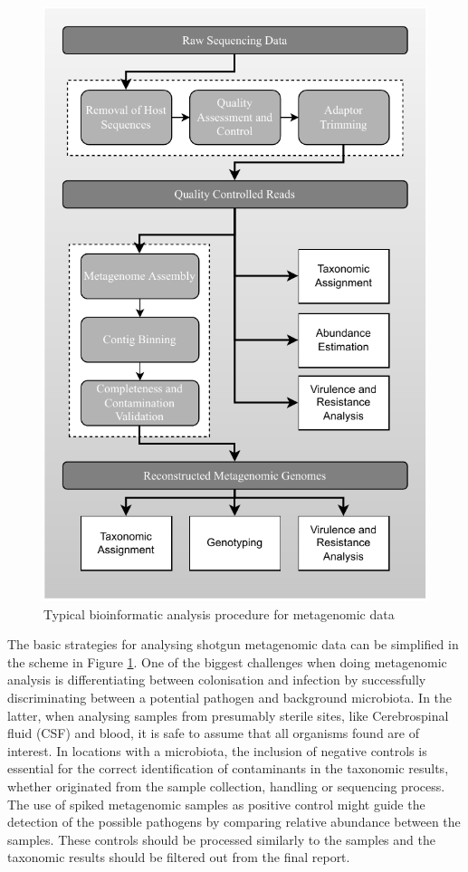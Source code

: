 \begin{figure}[h!]
\centering
\includegraphics[]{figures/introduction/Figure9.pdf}
\caption{Typical bioinformatic analysis procedure for metagenomic data}
\label{fig:figure9}
\end{figure}

The basic strategies for analysing shotgun metagenomic data can be simplified in the scheme in Figure \ref{fig:figure9}. 
One of the biggest challenges when doing metagenomic analysis is differentiating between colonisation and infection by successfully discriminating between a potential pathogen and background microbiota. 
In the latter, when analysing samples from presumably sterile sites, like Cerebrospinal fluid (CSF) and blood, it is safe to assume that all organisms found are of interest. 
In locations with a microbiota, the inclusion of negative controls is essential for the correct identification of contaminants in the taxonomic results, whether originated from the sample collection, handling or sequencing process. 
The use of spiked metagenomic samples as positive control might guide the detection of the possible pathogens by comparing relative abundance between the samples. 
These controls should be processed similarly to the samples and the taxonomic results should be filtered out from the final report. 

